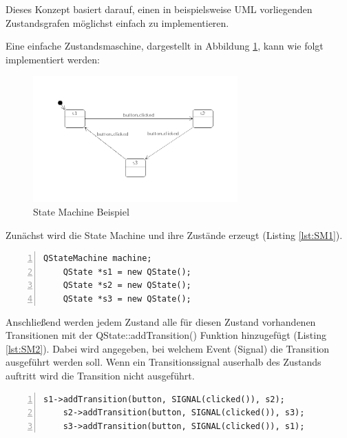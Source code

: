 Dieses Konzept basiert darauf, einen in beispielsweise UML vorliegenden Zustandsgrafen möglichst einfach zu implementieren. 

Eine einfache Zustandsmaschine, dargestellt in Abbildung \ref{fig:StateMachineexample}, kann wie folgt implementiert werden:

\begin{figure}[htb]
    \centering
    \includegraphics[width=0.7\textwidth]{Abbildungen/statemachinebutton.png}
    \caption[State Machine Beispiel \newline Quelle: \textit{https://doc.qt.io/qt-5/statemachine-api.html}]{State Machine Beispiel}		
    \label{fig:StateMachineexample}
\end{figure}

Zunächst wird die State Machine und ihre Zustände erzeugt (Listing \ref{lst:SM1}). 

\begin{lstlisting}[frame=single, breaklines=true, numbers=left, stepnumber=2, firstnumber=1, numberstyle = \tiny, caption=State Machine Beispiel Teil 1 ,label=lst:SM1]
    QStateMachine machine;
    QState *s1 = new QState();
    QState *s2 = new QState();
    QState *s3 = new QState();
\end{lstlisting}

Anschließend werden jedem Zustand alle für diesen Zustand vorhandenen Transitionen mit der QState::addTransition() Funktion hinzugefügt (Listing \ref{lst:SM2}). Dabei wird angegeben, bei welchem Event (Signal) die Transition ausgeführt werden soll. Wenn ein Transitionssignal auserhalb des Zustands auftritt wird die Transition nicht ausgeführt. 

\begin{lstlisting}[frame=single, breaklines=true, numbers=left, stepnumber=2, firstnumber=1, numberstyle = \tiny, caption=State Machine Beispiel Teil 2 ,label=lst:SM2]
    s1->addTransition(button, SIGNAL(clicked()), s2);
    s2->addTransition(button, SIGNAL(clicked()), s3);
    s3->addTransition(button, SIGNAL(clicked()), s1);
\end{lstlisting}

